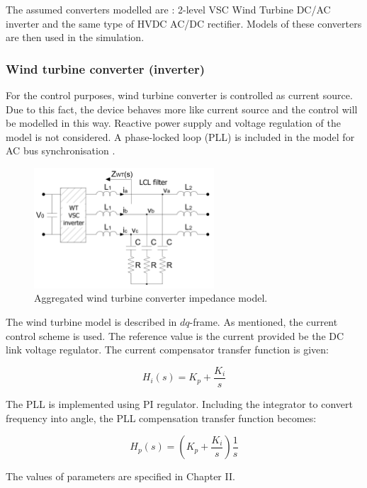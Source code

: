 \documentclass[12pt]{report} %
\begin{document}
The assumed converters modelled are \cite{liusun2014}: 2-level VSC Wind Turbine DC/AC inverter and the same type of HVDC AC/DC rectifier. Models of these converters are then used in the simulation.

\subsubsection{Wind turbine converter (inverter)}
For the control purposes, wind turbine converter is controlled as current source. Due to this fact, the device behaves more like current source and the control will be modelled in this way. Reactive power supply and voltage regulation of the model is not considered. A phase-locked loop (PLL) is included in the model for AC bus synchronisation \cite{liusun2014}.

\begin{figure}[htb]
	\centering
    	\includegraphics[width=0.6\textwidth]{img/theory/WT_scheme.png}
  	\caption{Aggregated wind turbine converter impedance model.}
  	\label{fig:wtscheme}
\end{figure}
\FloatBarrier

The wind turbine model is described in $dq$-frame. As mentioned, the current control scheme is used. The reference value is the current provided be the DC link voltage regulator. The current compensator transfer function is given:

\begin{equation}
	H_i (s)=K_p +\dfrac{K_i}{s}
\end{equation}

The PLL is implemented using PI regulator. Including the integrator to convert frequency into angle, the PLL compensation transfer function becomes:

\begin{equation}
	H_p (s)=\left ( K_p +\dfrac{K_i}{s} \right )\dfrac{1}{s}
\end{equation}

The values of parameters are specified in Chapter II.
\end{document}
